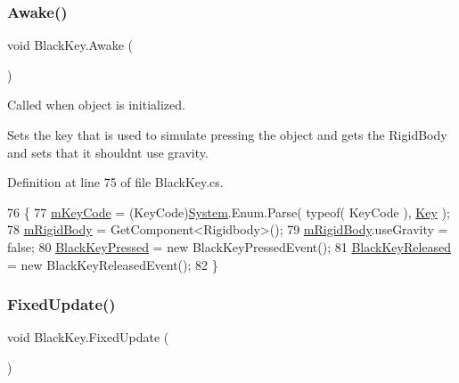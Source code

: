\subsubsection{\texorpdfstring{Awake()}{Awake()}}
{\footnotesize\ttfamily void Black\+Key.\+Awake (\begin{DoxyParamCaption}{ }\end{DoxyParamCaption})\hspace{0.3cm}{\ttfamily [private]}}



Called when object is initialized. 

Sets the key that is used to simulate pressing the object and gets the Rigid\+Body and sets that it shouldn\textquotesingle{}t use gravity. 

Definition at line 75 of file Black\+Key.\+cs.


\begin{DoxyCode}
76     \{
77         \hyperlink{group___black_key_priv_var_ga2272fa345880793dcd89f7ca942f6685}{mKeyCode} = (KeyCode)\hyperlink{namespace_system}{System}.Enum.Parse( typeof( KeyCode ), 
      \hyperlink{group___black_key_pub_var_gaa541d3fb6cbb1361d5c062ce7b3c4e29}{Key} );
78         \hyperlink{group___black_key_priv_var_ga5185c6ea66892bcbe9e83eb615f39566}{mRigidBody} = GetComponent<Rigidbody>();
79         \hyperlink{group___black_key_priv_var_ga5185c6ea66892bcbe9e83eb615f39566}{mRigidBody}.useGravity = \textcolor{keyword}{false};
80         \hyperlink{group___black_key_events_ga51f1badf49df0c54e31a20ba4b7abd6b}{BlackKeyPressed} = \textcolor{keyword}{new} BlackKeyPressedEvent();
81         \hyperlink{group___black_key_events_ga2710bdaba16dbdb82c0d38f11ce642d8}{BlackKeyReleased} = \textcolor{keyword}{new} BlackKeyReleasedEvent();
82     \}
\end{DoxyCode}
\mbox{\label{group___black_key_unity_gad8926397bba69558f5440eac2c38aff8}} 
\subsubsection{\texorpdfstring{Fixed\+Update()}{FixedUpdate()}}
{\footnotesize\ttfamily void Black\+Key.\+Fixed\+Update (\begin{DoxyParamCaption}{ }\end{DoxyParamCaption})\hspace{0.3cm}{\ttfamily [private]}}



